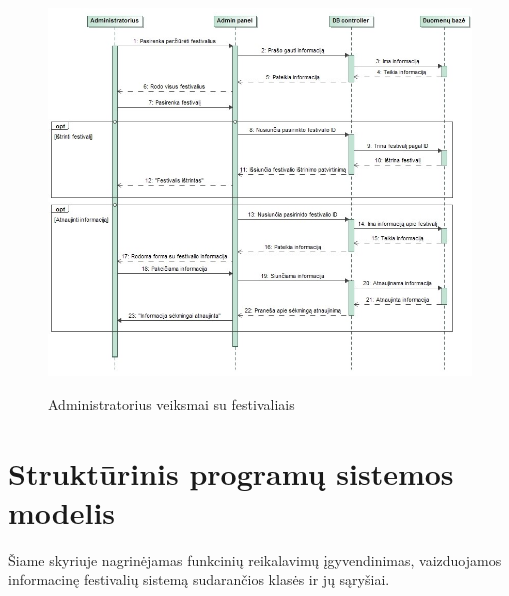 ﻿\documentclass{VUMIFPSkursinis}
\begin{document}
\begin{figure}[H]
    \centering
    \includegraphics[scale=0.45]{img/Pav/AdminIstrintiAtnaujintiFest}
    \label{img:uml12}
	\caption{Administratorius veiksmai su festivaliais}
\end{figure}	
	
	
	
\section{Struktūrinis programų sistemos modelis}
Šiame skyriuje nagrinėjamas funkcinių reikalavimų įgyvendinimas, vaizduojamos informacinę festivalių sistemą sudarančios klasės ir jų sąryšiai.
\end{document}
